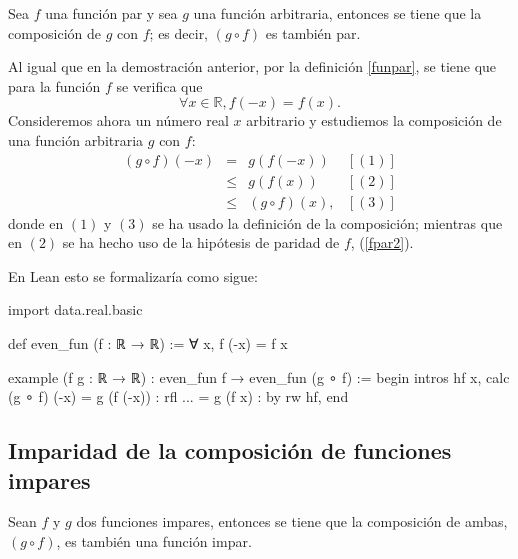 \begin{teorema}
  Sea \(f\) una función par y sea \(g\) una función arbitraria, entonces
  se tiene que la composición de \(g\) con \(f\); es decir, \((g ∘ f)\)
  es también par.
\end{teorema}

\begin{demostracion}
  Al igual que en la demostración anterior, por la definición
  \ref{funpar}, se tiene que para la función \(f\) se verifica que
  \begin{equation}\label{fpar2}
     ∀ x ∈ ℝ, f(-x) = f(x).
  \end{equation}
  Consideremos ahora un número real \(x\) arbitrario y estudiemos la
  composición de una función arbitraria \(g\) con \(f\):
  \[\begin{array}{llll}
      (g ∘ f)(-x) &= &g(f(-x))    & [(1)]\\
                  &≤ &g(f(x))     & [(2)] \\
                  &≤ &(g ∘ f)(x), & [(3)]
    \end{array}\]
  donde en \((1)\) y \((3)\) se ha usado la definición de la
  composición; mientras que en \((2)\) se ha hecho uso de la hipótesis
  de paridad de \(f\), (\ref{fpar2}).
\end{demostracion}

En Lean esto se formalizaría como sigue:
\begin{leancode}
import data.real.basic

def even_fun (f : ℝ → ℝ) := ∀ x, f (-x) = f x

example (f g : ℝ → ℝ) : even_fun f → even_fun (g ∘ f) :=
begin
  intros hf x,
  calc (g ∘ f) (-x)
      = g (f (-x)) : rfl
  ... = g (f x)    : by rw hf,
end
\end{leancode}


\subsection{Imparidad de la composición de funciones impares}

\begin{teorema}
  Sean \(f\) y \(g\) dos funciones impares, entonces se tiene que la
  composición de ambas, \((g ∘ f)\), es también una función impar.
\end{teorema}

